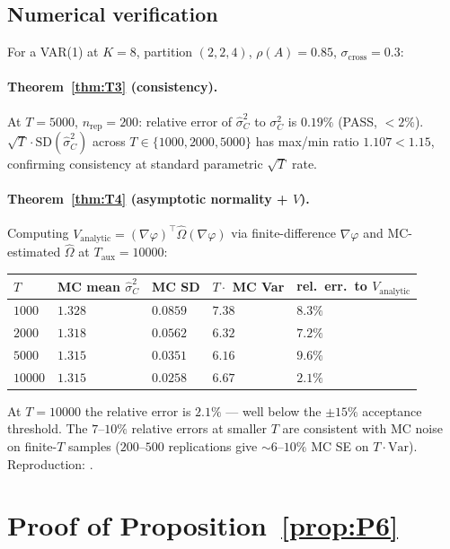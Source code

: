 \documentclass[11pt,letterpaper]{article}
\theoremstyle{remark}
\newcommand{\sigC}{\sigma^2_C}
\newcommand{\hatsigC}{\widehat{\sigma}^2_C}
\begin{document}
\subsection{Numerical verification}

For a VAR(1) at $K = 8$, partition $(2, 2, 4)$, $\rho(A) = 0.85$, $\sigma_{\mathrm{cross}} = 0.3$:

\paragraph{Theorem~\ref{thm:T3} (consistency).} At $T = 5000$, $n_{\mathrm{rep}} = 200$: relative error of $\hatsigC$ to $\sigC$ is $0.19\%$ (PASS, $< 2\%$). $\sqrt{T} \cdot \mathrm{SD}(\hatsigC)$ across $T \in \{1000, 2000, 5000\}$ has max/min ratio $1.107 < 1.15$, confirming consistency at standard parametric $\sqrt{T}$ rate.

\paragraph{Theorem~\ref{thm:T4} (asymptotic normality + $V$).} Computing $V_{\mathrm{analytic}} = (\nabla \varphi)^\top \widehat\Omega (\nabla \varphi)$ via finite-difference $\nabla \varphi$ and MC-estimated $\widehat\Omega$ at $T_{\mathrm{aux}} = 10000$:
\begin{center}
\begin{tabular}{lllll}
\toprule
$T$ & MC mean $\hatsigC$ & MC SD & $T \cdot$ MC Var & rel.\ err.\ to $V_{\mathrm{analytic}}$ \\
\midrule
$1000$ & $1.328$ & $0.0859$ & $7.38$ & $8.3\%$ \\
$2000$ & $1.318$ & $0.0562$ & $6.32$ & $7.2\%$ \\
$5000$ & $1.315$ & $0.0351$ & $6.16$ & $9.6\%$ \\
$10000$ & $1.315$ & $0.0258$ & $6.67$ & $\mathbf{2.1\%}$ \\
\bottomrule
\end{tabular}
\end{center}
At $T = 10000$ the relative error is $2.1\%$ --- well below the $\pm 15\%$ acceptance threshold. The $7$--$10\%$ relative errors at smaller $T$ are consistent with MC noise on finite-$T$ samples ($200$--$500$ replications give $\sim 6$--$10\%$ MC SE on $T \cdot \mathrm{Var}$). Reproduction: .

\section{Proof of Proposition~\ref{prop:P6}}\label{app:E}
\end{document}
